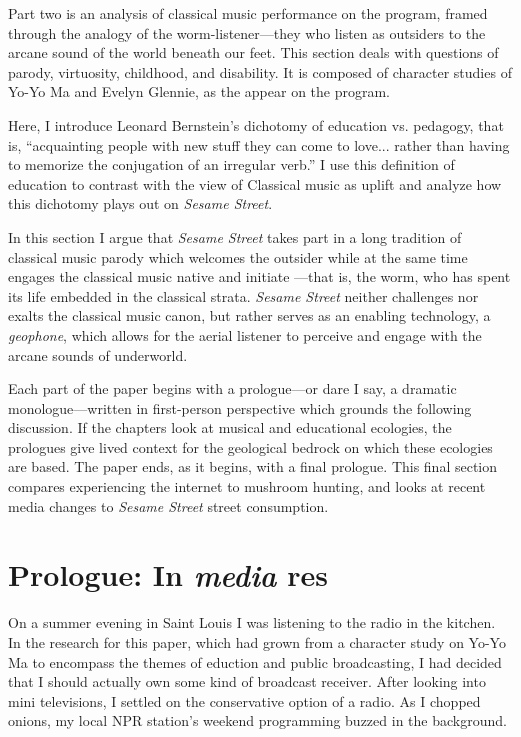 \documentclass[12pt,letterpaper]{article}
\newcommand{\ses}{\textit{Sesame Street }}
\begin{document}
	Part two is an analysis of classical music performance on the program, 
	framed through the analogy of the worm-listener---they who listen as 
	outsiders to 
	the arcane sound of the world beneath our feet. This section deals with
	questions of parody, virtuosity, childhood, and disability. It 
	is composed of character studies of Yo-Yo Ma and Evelyn Glennie, 
	as the appear on the program.   

	Here, I introduce Leonard Bernstein's dichotomy of education vs.
	pedagogy, that is, ``acquainting people with 
	new stuff they can come to love... rather than having to memorize the 
	conjugation of an irregular verb.''\autocite[71]{Kopfstein} I use this
	definition of education to contrast with the view of Classical music as 
	uplift and analyze how this dichotomy plays out on \textit{Sesame
	Street}.  

	In this section I argue that \textit{Sesame Street} takes part in a
	long tradition of classical music parody which welcomes the outsider
	while at the same time engages the classical music native and initiate
	---that is, the worm, who has spent its life embedded in the classical
	strata.
	\textit{Sesame Street} neither challenges nor exalts the classical 
	music canon, but rather serves as an enabling technology, a 
	\textit{geophone}, which allows for the aerial listener to perceive and
	engage with the arcane sounds of underworld.  
	
	Each part of the paper begins with a prologue---or dare I say, a 
	dramatic monologue---written in first-person perspective
	which grounds the following discussion. If the chapters look at
	musical and educational ecologies, the prologues give lived context for
	the geological bedrock on which these ecologies are based. The paper 
	ends, as it begins, with a final prologue. This final section compares
	experiencing the internet to mushroom hunting, and looks at recent media	changes to \ses street consumption.  

	\newpage	
	\section*{Prologue: In \textit{media} res}
	
	\noindent
	On a summer evening in Saint Louis I was listening to the radio in
	the kitchen. In the research for this paper, which had grown from a 
	character
	study on Yo-Yo Ma to encompass the themes of eduction and public 
	broadcasting,
	I had decided that I should actually own some kind of broadcast 
	receiver. 
	After looking into mini televisions, I settled on the conservative 
	option
	of a radio. As I chopped onions, my local NPR station's weekend 
	programming
	buzzed in the background.
	
\end{document}
